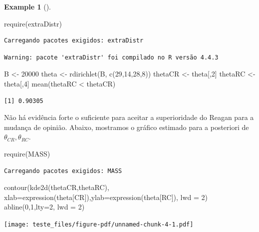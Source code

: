 \documentclass[
  letterpaper,
  DIV=11,
  numbers=noendperiod]{scrreprt}
\newenvironment{Shaded}{\begin{snugshade}}{\end{snugshade}}
\newcommand{\AttributeTok}[1]{\textcolor[rgb]{0.40,0.45,0.13}{#1}}
\newcommand{\DecValTok}[1]{\textcolor[rgb]{0.68,0.00,0.00}{#1}}
\newcommand{\FunctionTok}[1]{\textcolor[rgb]{0.28,0.35,0.67}{#1}}
\newcommand{\NormalTok}[1]{\textcolor[rgb]{0.00,0.23,0.31}{#1}}
\newcommand{\OtherTok}[1]{\textcolor[rgb]{0.00,0.23,0.31}{#1}}
\newcommand{\SpecialCharTok}[1]{\textcolor[rgb]{0.37,0.37,0.37}{#1}}
\theoremstyle{plain}
\theoremstyle{definition}
\theoremstyle{definition}
\newtheorem{example}{Example}[chapter]
\theoremstyle{remark}
\begin{document}
\begin{example}[]
\begin{Shaded}
\begin{Highlighting}[]
\FunctionTok{require}\NormalTok{(extraDistr)}
\end{Highlighting}
\end{Shaded}

\begin{verbatim}
Carregando pacotes exigidos: extraDistr
\end{verbatim}

\begin{verbatim}
Warning: pacote 'extraDistr' foi compilado no R versão 4.4.3
\end{verbatim}

\begin{Shaded}
\begin{Highlighting}[]
\NormalTok{B }\OtherTok{\textless{}{-}} \DecValTok{20000}
\NormalTok{theta }\OtherTok{\textless{}{-}} \FunctionTok{rdirichlet}\NormalTok{(B, }\FunctionTok{c}\NormalTok{(}\DecValTok{29}\NormalTok{,}\DecValTok{14}\NormalTok{,}\DecValTok{28}\NormalTok{,}\DecValTok{8}\NormalTok{))}
\NormalTok{thetaCR }\OtherTok{\textless{}{-}}\NormalTok{ theta[,}\DecValTok{2}\NormalTok{]}
\NormalTok{thetaRC }\OtherTok{\textless{}{-}}\NormalTok{ theta[,}\DecValTok{4}\NormalTok{]}
\FunctionTok{mean}\NormalTok{(thetaRC }\SpecialCharTok{\textless{}}\NormalTok{ thetaCR)}
\end{Highlighting}
\end{Shaded}

\begin{verbatim}
[1] 0.90305
\end{verbatim}

Não há evidência forte o suficiente para aceitar a superioridade do
Reagan para a mudança de opinião. Abaixo, mostramos o gráfico estimado
para a posteriori de \(\theta_{CR},\theta_{RC}\).

\begin{Shaded}
\begin{Highlighting}[]
\FunctionTok{require}\NormalTok{(MASS)}
\end{Highlighting}
\end{Shaded}

\begin{verbatim}
Carregando pacotes exigidos: MASS
\end{verbatim}

\begin{Shaded}
\begin{Highlighting}[]
\FunctionTok{contour}\NormalTok{(}\FunctionTok{kde2d}\NormalTok{(thetaCR,thetaRC), }\AttributeTok{xlab=}\FunctionTok{expression}\NormalTok{(theta[CR]),}\AttributeTok{ylab=}\FunctionTok{expression}\NormalTok{(theta[RC]), }\AttributeTok{lwd =} \DecValTok{2}\NormalTok{)}
\FunctionTok{abline}\NormalTok{(}\DecValTok{0}\NormalTok{,}\DecValTok{1}\NormalTok{,}\AttributeTok{lty=}\DecValTok{2}\NormalTok{, }\AttributeTok{lwd =} \DecValTok{2}\NormalTok{)}
\end{Highlighting}
\end{Shaded}

\texttt{[image: teste\_files/figure-pdf/unnamed-chunk-4-1.pdf]}

\end{example}
\end{document}

